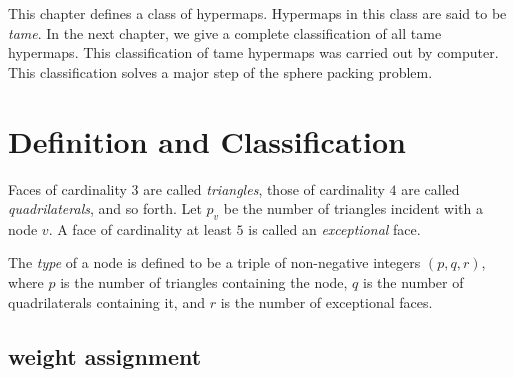



\label{sec:tame}


This chapter defines a class of hypermaps.  Hypermaps in this class
are said to be {\it tame}.  In the next chapter, we give a complete
classification of all tame hypermaps.  This classification of tame
hypermaps was carried out by computer.   This classification solves a
major step of the sphere packing problem.

\section{Definition and Classification}


\begin{definition}
Faces of cardinality $3$ are called {\it triangles}, those of
cardinality $4$ are called {\it quadrilaterals}, and so forth. Let
$p_v$ be the number of triangles incident with a node $v$. A face of
cardinality at least $5$ is called an {\it exceptional\/} face.
\end{definition}

\begin{definition}[type,~$(p,q,r)$]\label{definition:type}
The {\it type\/} of a node is defined to be a triple of
non-negative integers $(p,q,r)$, where $p$ is the number of
triangles containing the node, $q$ is the number of quadrilaterals
containing it, and $r$ is the number of exceptional faces.
%
\end{definition}


\subsection{weight assignment}\label{sec:wtassign}

